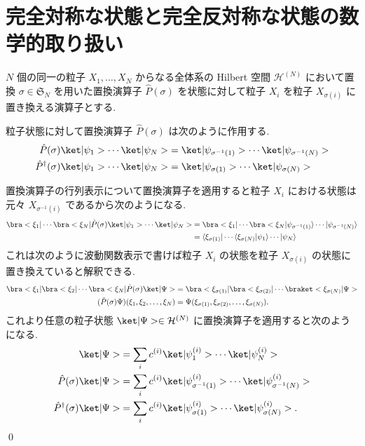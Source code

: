 \documentclass[uplatex,dvipdfmx,a4paper,11pt]{jlreq}
\makeatletter
\newcommand{\HH}{\mathcal{H}}
\renewcommand{\SS}{\mathfrak{S}}
\numberwithin{equation}{section}
\theoremstyle{definition}
\renewenvironment{proof}[1][\proofname]{\par
  \normalfont
  \topsep6\p@\@plus6\p@ \trivlist
  \item[\hskip\labelsep{\bfseries #1}\@addpunct{\bfseries}]\ignorespaces\quad\par
}{%
  \qed\endtrivlist\@endpefalse
}
\renewcommand\proofname{証明}
\makeatother
\begin{document}
\section{完全対称な状態と完全反対称な状態の数学的取り扱い}
\begin{definition}[置換演算子]
  $N$ 個の同一の粒子 $X_1,\ldots,X_N$ からなる全体系の Hilbert 空間 $\HH^{(N)}$ において置換 $\sigma\in\SS_N$ を用いた置換演算子 $\hat{P}(\sigma)$ を状態に対して粒子 $X_i$ を粒子 $X_{\sigma(i)}$ に置き換える演算子とする.
\end{definition}

\begin{proposition}[Q21-9, Q21-10(i)(ii)]
  粒子状態に対して置換演算子 $\hat{P}(\sigma)$ は次のように作用する.
  \begin{align}
    \hat{P}(\sigma)\ket|\psi_1>\cdots\ket|\psi_N>         & = \ket|\psi_{\sigma^{-1}(1)}>\cdots\ket|\psi_{\sigma^{-1}(N)}> \\
    \hat{P}^\dagger(\sigma)\ket|\psi_1>\cdots\ket|\psi_N> & = \ket|\psi_{\sigma(1)}>\cdots\ket|\psi_{\sigma(N)}>
  \end{align}
\end{proposition}
\begin{proof}
  置換演算子の行列表示について置換演算子を適用すると粒子 $X_i$ における状態は元々 $X_{\sigma^{-1}(i)}$ であるから次のようになる.
  \begin{align}
    \bra<\xi_1|\cdots\bra<\xi_N|\hat{P}(\sigma)\ket|\psi_1>\cdots\ket|\psi_N> & = \bra<\xi_1|\cdots\bra<\xi_N|\psi_{\sigma^{-1}(1)}\rangle\cdots|\psi_{\sigma^{-1}(N)}\rangle \\
                                                                              & = \langle\xi_{\sigma(1)}|\cdots\langle\xi_{\sigma(N)}|\psi_1\rangle\cdots|\psi_N\rangle
  \end{align}
  これは次のように波動関数表示で書けば粒子 $X_i$ の状態を粒子 $X_{\sigma(i)}$ の状態に置き換えていると解釈できる.
  \begin{align}
    \bra<\xi_1|\bra<\xi_2|\cdots\bra<\xi_N|\hat{P}(\sigma)\ket|\Psi> & = \bra<\xi_{\sigma(1)}|\bra<\xi_{\sigma(2)}|\cdots\braket<\xi_{\sigma(N)}|\Psi> \\
    (\hat{P}(\sigma)\Psi)(\xi_1,\xi_2,\ldots,\xi_N)                  & = \Psi(\xi_{\sigma(1)},\xi_{\sigma(2)},\ldots,\xi_{\sigma(N)}).
  \end{align}
  これより任意の粒子状態 $\ket|\Psi>\in\HH^{(N)}$ に置換演算子を適用すると次のようになる.
  \begin{align}
    \ket|\Psi>                        & = \sum_{i}c^{(i)}\ket|\psi_1^{(i)}>\cdots\ket|\psi_N^{(i)}>                               \\
    \hat{P}(\sigma)\ket|\Psi>         & = \sum_{i}c^{(i)}\ket|\psi_{\sigma^{-1}(1)}^{(i)}>\cdots\ket|\psi_{\sigma^{-1}(N)}^{(i)}> \\
    \hat{P}^\dagger(\sigma)\ket|\Psi> & = \sum_{i}c^{(i)}\ket|\psi_{\sigma(1)}^{(i)}>\cdots\ket|\psi_{\sigma(N)}^{(i)}>.
  \end{align}
\end{proof}
\end{document}

